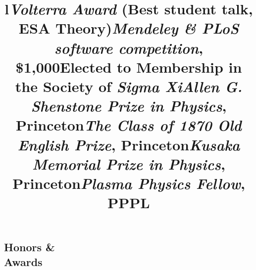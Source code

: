 \documentclass[margin]{res}
\begin{document}
\begin{resume}
\section{Honors \& \\ Awards}
\begin{format}
\title{l}\\
\body
\end{format}



\title{\emph{Volterra Award} (Best student talk, ESA Theory)}
\begin{position} \vspace{-.7cm} \end{position}

\title{\emph{Mendeley \& PLoS software competition}, \$1,000}
\begin{position} \vspace{-.7cm} \end{position}

\title{Elected to Membership in the Society of \emph{Sigma Xi}}
\begin{position}   \vspace{-.7cm} \end{position}

\title{\emph{Allen G. Shenstone Prize in Physics}, Princeton}
\begin{position}   \vspace{-.7cm} \end{position}

\title{\emph{The Class of 1870 Old English Prize},  Princeton}
\begin{position}   \vspace{-.7cm} \end{position}

\title{\emph{Kusaka Memorial Prize in Physics}, Princeton}
\begin{position}   \vspace{-.7cm} \end{position}

\title{\emph{Plasma Physics Fellow},  PPPL }
\begin{position}   \vspace{-.7cm} \end{position}



  

\end{resume}
\end{document}
